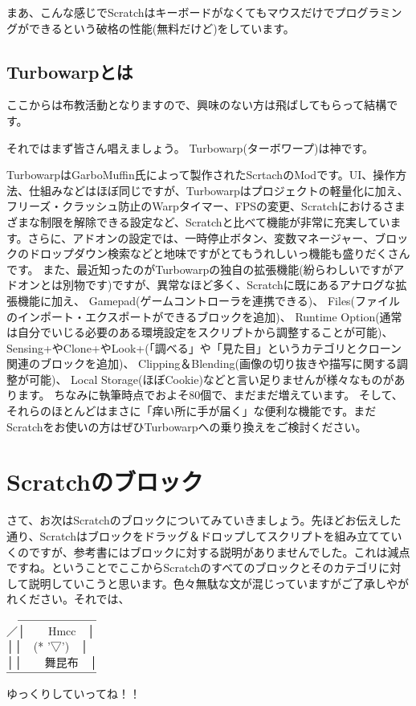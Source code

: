 \documentclass[b5paper,10pt]{jsarticle}
\begin{document}
\begin{multicols*}{3}
まあ、こんな感じでScratchはキーボードがなくてもマウスだけでプログラミングができるという破格の性能(無料だけど)をしています。
\subsection{Turbowarpとは}
ここからは布教活動となりますので、興味のない方は飛ばしてもらって結構です。

それではまず皆さん唱えましょう。
Turbowarp(ターボワープ)は神です。

TurbowarpはGarboMuffin氏によって製作されたScrtachのModです。UI、操作方法、仕組みなどはほぼ同じですが、Turbowarpはプロジェクトの軽量化に加え、フリーズ・クラッシュ防止のWarpタイマー、FPSの変更、Scratchにおけるさまざまな制限を解除できる設定など、Scratchと比べて機能が非常に充実しています。さらに、アドオンの設定では、一時停止ボタン、変数マネージャー、ブロックのドロップダウン検索などと地味ですがとてもうれしいっ機能も盛りだくさんです。
また、最近知ったのがTurbowarpの独自の拡張機能(紛らわしいですがアドオンとは別物です)ですが、異常なほど多く、Scratchに既にあるアナログな拡張機能に加え、
Gamepad(ゲームコントローラを連携できる)、
Files(ファイルのインポート・エクスポートができるブロックを追加)、
Runtime Option(通常は自分でいじる必要のある環境設定をスクリプトから調整することが可能)、
Sensing+やClone+やLook+(「調べる」や「見た目」というカテゴリとクローン関連のブロックを追加)、
Clipping＆Blending(画像の切り抜きや描写に関する調整が可能)、
Local Storage(ほぼCookie)などと言い足りませんが様々なものがあります。
ちなみに執筆時点でおよそ80個で、まだまだ増えています。
そして、それらのほとんどはまさに「痒い所に手が届く」な便利な機能です。まだScratchをお使いの方はぜひTurbowarpへの乗り換えをご検討ください。

\section{Scratchのブロック}

さて、お次はScratchのブロックについてみていきましょう。先ほどお伝えした通り、Scratchはブロックをドラッグ＆ドロップしてスクリプトを組み立てていくのですが、参考書にはブロックに対する説明がありませんでした。これは減点ですね。ということでここからScratchのすべてのブロックとそのカテゴリに対して説明していこうと思います。色々無駄な文が混じっていますがご了承しやがれください。それでは、\\
　＿＿＿＿＿＿＿\\
／│　　Hmcc　│\\
││　(* '▽')　│\\
││　　舞昆布　│\\
￣￣￣￣￣￣￣￣\\
ゆっくりしていってね！！
\pagebreak

\end{multicols*}
\end{document}
